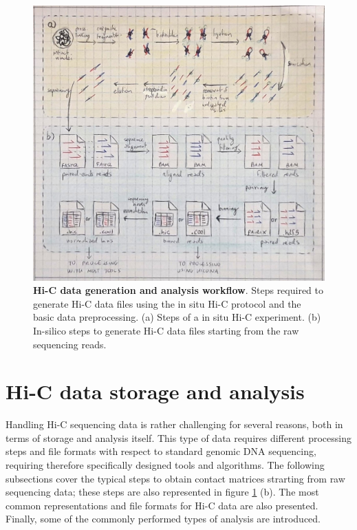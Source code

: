 \begin{figure}[ht]
  \centering
  \includegraphics[width=1\textwidth]{hic_pipeline.jpeg}
  \caption{\textbf{Hi-C data generation and analysis workflow}. Steps required to generate Hi-C data files using the in situ Hi-C protocol and the basic data preprocessing. (a) Steps of a in situ Hi-C experiment. (b) In-silico steps to generate Hi-C data files starting from the raw sequencing reads.}
  \label{fig:pipeline}
\end{figure}

\newpage
\section{Hi-C data storage and analysis}

Handling Hi-C sequencing data is rather challenging for several reasons, both in terms of storage and analysis itself. This type of data requires different processing steps and file formats with respect to standard genomic DNA sequencing, requiring therefore specifically designed tools and algorithms. The following subsections cover the typical steps to obtain contact matrices strarting from raw sequencing data\cite{hicprocessing2018}; these steps are also represented in figure \ref{fig:pipeline} (b). The most common representations and file formats for Hi-C data are also presented. Finally, some of the commonly performed types of analysis are introduced.

